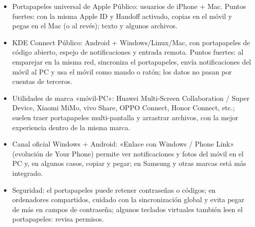 \begin{itemize}
  \item Portapapeles universal de Apple Público: usuarios de iPhone + Mac. Puntos fuertes: con la misma Apple ID y Handoff activado, copias en el móvil y pegas en el Mac (o al revés); texto y algunos archivos.
  \item KDE Connect Público: Android + Windows/Linux/Mac, con portapapeles de código abierto, espejo de notificaciones y entrada remota. Puntos fuertes: al emparejar en la misma red, sincroniza el portapapeles, envía notificaciones del móvil al PC y usa el móvil como mando o ratón; los datos no pasan por cuentas de terceros.
  \item Utilidades de marca «móvil-PC»: Huawei Multi-Screen Collaboration / Super Device, Xiaomi MiMo, vivo Share, OPPO Connect, Honor Connect, etc.; suelen traer portapapeles multi-pantalla y arrastrar archivos, con la mejor experiencia dentro de la misma marca.
  \item Canal oficial Windows + Android: «Enlace con Windows / Phone Link» (evolución de Your Phone) permite ver notificaciones y fotos del móvil en el PC y, en algunos casos, copiar y pegar; en Samsung y otras marcas está más integrado.
  \item Seguridad: el portapapeles puede retener contraseñas o códigos; en ordenadores compartidos, cuidado con la sincronización global y evita pegar de más en campos de contraseña; algunos teclados virtuales también leen el portapapeles: revisa permisos.
\end{itemize}


